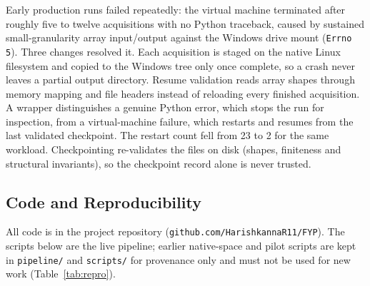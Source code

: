 \documentclass{ssnreview}
\begin{document}
Early production runs failed repeatedly: the virtual machine terminated after roughly five
to twelve acquisitions with no Python traceback, caused by sustained small-granularity
array input/output against the Windows drive mount (\texttt{Errno 5}). Three changes
resolved it. Each acquisition is staged on the native Linux filesystem and copied to the
Windows tree only once complete, so a crash never leaves a partial output directory.
Resume validation reads array shapes through memory mapping and file headers instead of
reloading every finished acquisition. A wrapper distinguishes a genuine Python error, which
stops the run for inspection, from a virtual-machine failure, which restarts and resumes
from the last validated checkpoint. The restart count fell from 23 to 2 for the same
workload. Checkpointing re-validates the files on disk (shapes, finiteness and structural
invariants), so the checkpoint record alone is never trusted.

\subsection{Code and Reproducibility}\label{sec:repro}

All code is in the project repository (\texttt{github.com/HarishkannaR11/FYP}). The scripts
below are the live pipeline; earlier native-space and pilot scripts are kept in
\texttt{pipeline/} and \texttt{scripts/} for provenance only and must not be used for new
work (Table~\ref{tab:repro}).
\end{document}
